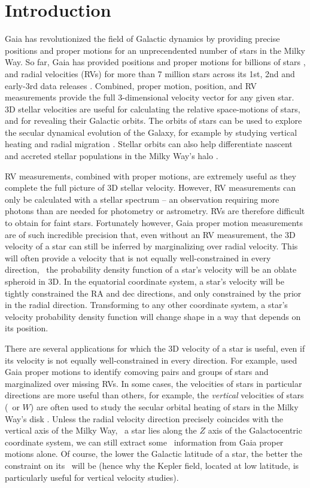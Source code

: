 \section{Introduction}

Gaia has revolutionized the field of Galactic dynamics by providing precise
positions and proper motions for an unprecendented number of stars in the
Milky Way.
So far, Gaia has provided positions and proper motions for billions of stars ,
and radial velocities (RVs) for more than 7 million stars across its 1st, 2nd and
early-3rd data releases \citep{gaia, gaia_dr2}.
Combined, proper motion, position, and RV measurements provide the full
3-dimensional velocity vector for any given star.
3D stellar velocities are useful for calculating the relative space-motions of
stars, and for revealing their Galactic orbits.
The orbits of stars can be used to explore the secular dynamical evolution of
the Galaxy, for example by studying vertical heating and radial migration
\citep{citations}.
Stellar orbits can also help differentiate nascent and accreted stellar
populations in the Milky Way's halo \citep{citation}.

RV measurements, combined with proper motions, are extremely useful as they
complete the full picture of 3D stellar velocity.
However, RV measurements can only be calculated with a stellar spectrum -- an
observation requiring more photons than are needed for photometry or
astrometry.
RVs are therefore difficult to obtain for faint stars.
Fortunately however, Gaia proper motion measurements are of such incredible
precision that, even without an RV measurement, the 3D velocity of a star can
still be inferred by marginalizing over radial velocity.
This will often provide a velocity that is not equally well-constrained in
every direction, \ie\ the probability density function of a star's velocity
will be an oblate spheroid in 3D.
In the equatorial coordinate system, a star's velocity will be tightly
constrained the RA and dec directions, and only constrained by the prior in
the radial direction.
Transforming to any other coordinate system, a star's velocity probability
density function will change shape in a way that depends on its position.

There are several applications for which the 3D velocity of a star is useful,
even if its velocity is not equally well-constrained in every direction.
For example, \citet{oh2017} used Gaia proper motions to identify comoving
pairs and groups of stars and marginalized over missing RVs.
In some cases, the velocities of stars in particular directions are more
useful than others, for example, the {\it vertical} velocities of stars (\vz\
or $W$) are often used to study the secular orbital heating of stars in the
Milky Way's disk \citep[\eg][]{ting2019, beane2018, yu2018, citations}.
Unless the radial velocity direction precisely coincides with the vertical
axis of the Milky Way, \ie\ a star lies along the $Z$ axis of the
Galactocentric coordinate system, we can still extract some \vz\ information
from Gaia proper motions alone.
Of course, the lower the Galactic latitude of a star, the better the
constraint on its \vz\ will be (hence why the Kepler field, located at low
latitude, is particularly useful for vertical velocity studies).


